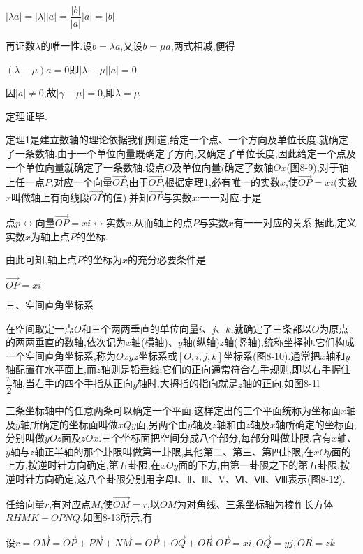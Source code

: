 \documentclass[oneside]{book}
\begin{document}
$|\lambda a| = |\lambda ||a| = \dfrac{{|b|}}{{|a|}}|a| = |b|$

再证数$\lambda $的唯一性.设$b = \lambda a$,又设$b = \mu a$,两式相减,便得

$(\lambda  - \mu )a = 0$即$|\lambda  - \mu ||a| = 0$

因$|a| \ne 0$,故$|\gamma  - \mu | = 0$,即$\lambda  = \mu $

定理证毕.

定理1是建立数轴的理论依据我们知道,给定一个点、一个方向及单位长度,就确定了一条数轴.由于一个单位向量既确定了方向,又确定了单位长度,因此给定一个点及一个单位向量就确定了一条数轴.设点$O$及单位向量$i$确定了数轴$Ox$(图8-9),对于轴上任一点$P$,对应一个向量$\overrightarrow {OP} $,由于$\overrightarrow {OP} $,根据定理1,必有唯一的实数$x$,使$\overrightarrow {OP}  = xi$(实数$x$叫做轴上有向线段$\overrightarrow {OP} $的值),并知$\overrightarrow {OP} $与实数$x$:一一对应.于是

点$p \leftrightarrow $向量$\overrightarrow {OP}  = xi \leftrightarrow $实数$x$,从而轴上的点$P$与实数$x$有一一对应的关系.据此,定义实数$x$为轴上点$P$的坐标.

由此可知,轴上点$P$的坐标为$x$的充分必要条件是

$\overrightarrow {OP}  = xi$

三、空间直角坐标系

在空间取定一点$O$和三个两两垂直的单位向量$i$、$j$、$k$,就确定了三条都以$O$为原点的两两垂直的数轴,依次记为$x$轴(横轴)、$y$轴(纵轴)$z$轴(竖轴),统称坐择神.它们构成一个空间直角坐标系,称为$Oxyz$坐标系或$[O,i,j,k]$坐标系(图8-10).通常把$x$轴和$y$轴配置在水平面上,而$z$轴则是铅垂线;它们的正向通常符合右手规则,即以右手握住$\dfrac{\pi }{2}$轴,当右手的四个手指从正向$y$轴时,大拇指的指向就是$z$轴的正向,如图8-1l

三条坐标轴中的任意两条可以确定一个平面,这样定出的三个平面统称为坐标面$x$轴及$y$轴所确定的坐标面叫做$xQy$面,另两个由$y$轴及$z$轴和由$z$轴及$x$轴所确定的坐标面,分别叫做$yOz$面及$zOx$.三个坐标面把空间分成八个部分,每部分叫做卦限.含有$x$轴、$y$轴与$z$轴正半轴的那个卦限叫做第一卦限,其他第二、第三、第四卦限,在$xOy$面的上方,按逆时针方向确定,第五卦限,在$xOy$面的下方,由第一卦限之下的第五卦限,按逆时针方向确定,这八个卦限分别用字母Ⅰ、Ⅱ、Ⅲ、V、Ⅵ、Ⅶ、Ⅷ表示(图8-12).

任给向量$r$,有对应点$M$,使$\overrightarrow {OM}  = r$,以$OM$为对角线、三条坐标轴为棱作长方体$RHMK-OPNQ$,如图8-13所示,有

设$r=\overrightarrow{O M}=\overrightarrow{O P}+\overrightarrow{P N}+\overrightarrow{N M}=\overrightarrow{O P}+\overrightarrow{O Q}+\overrightarrow{O R}$
$\overrightarrow{O P}=x i, \overrightarrow{O Q}=y j, \overrightarrow{O R}=z k$
\end{document}
